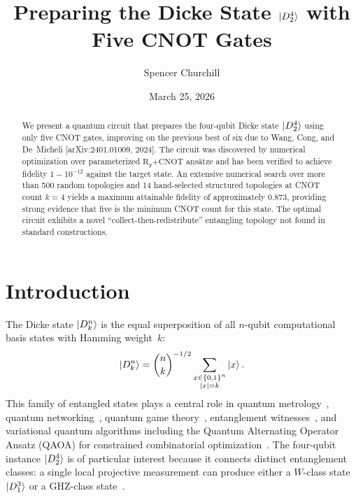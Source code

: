 \documentclass[twocolumn,10pt]{article}
\newcommand{\Ry}{\mathrm{R}_y}
\newcommand{\CNOT}{\mathrm{CNOT}}
\begin{document}
\title{Preparing the Dicke State $\ket{D_2^4}$ with Five CNOT Gates}

\author{Spencer Churchill}

\date{March 25, 2026}

\begin{abstract}
We present a quantum circuit that prepares the four-qubit Dicke state
$\ket{D_2^4}$ using only five CNOT gates, improving on the previous best
of six due to Wang, Cong, and De~Micheli [arXiv:2401.01009, 2024]. The
circuit was discovered by numerical optimization over parameterized
$\Ry$+$\CNOT$ ans\"atze and has been verified to achieve fidelity
$1 - 10^{-12}$ against the target state. An extensive numerical search over
more than 500 random topologies and 14 hand-selected structured topologies at
CNOT count $k=4$ yields a maximum attainable fidelity of approximately
$0.873$, providing strong evidence that five is the minimum CNOT count for
this state. The optimal circuit exhibits a novel ``collect-then-redistribute''
entangling topology not found in standard constructions.
\end{abstract}

\maketitle

\section{Introduction}
\label{sec:intro}

The Dicke state $\ket{D_k^n}$ is the equal superposition of all $n$-qubit
computational basis states with Hamming weight~$k$:
\begin{equation}\label{eq:dicke}
    \ket{D_k^n} = \binom{n}{k}^{-1/2}
    \sum_{\substack{x \in \{0,1\}^n \\ |x|=k}} \ket{x}.
\end{equation}
This family of entangled states plays a central role in quantum metrology~\cite{Toth2012},
quantum networking~\cite{Prevedel2009}, quantum game theory~\cite{Oezdemir2007},
entanglement witnesses~\cite{Kiesel2007}, and variational quantum
algorithms including the Quantum Alternating Operator Ansatz (QAOA) for
constrained combinatorial optimization~\cite{Hadfield2019}. The four-qubit
instance $\ket{D_2^4}$ is of particular interest because it connects
distinct entanglement classes: a single local projective measurement can produce
either a $W$-class state $\ket{D_1^3}$ or a GHZ-class
state~\cite{Kiesel2007,Duer2000}.
\end{document}
